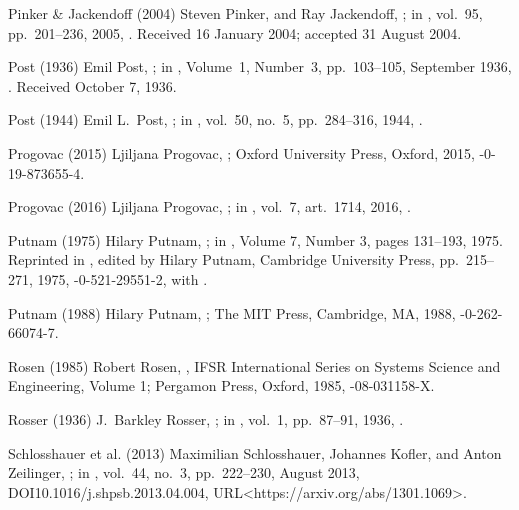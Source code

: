 \biblabel Pinker \& Jackendoff (2004)
Steven Pinker, and Ray Jackendoff,
;
in ,
vol.\ 95, pp.\ 201--236, 2005,
.
Received 16 January 2004; accepted 31 August 2004.

\biblabel Post (1936)
Emil Post,
;
in ,
Volume\ 1, Number\ 3, pp.~103--105, September 1936,
.
Received October 7, 1936.

\biblabel Post (1944)
Emil L.\ Post,
;
in ,
vol.\ 50, no.~5, pp.\ 284--316, 1944,
.

\biblabel Progovac (2015)
Ljiljana Progovac,
;
Oxford University Press, Oxford, 2015,
-0-19-873655-4.

\biblabel Progovac (2016)
Ljiljana Progovac,
;
in ,
vol.\ 7, art.\ 1714, 2016,
.

\biblabel Putnam (1975)
Hilary Putnam,
;
in ,
Volume 7, Number 3, pages 131--193, 1975.
Reprinted in
,
edited by Hilary Putnam,
Cambridge University Press, pp.\ 215--271, 1975,
-0-521-29551-2, with
.

\biblabel Putnam (1988)
Hilary Putnam,
;
The MIT Press, Cambridge, MA, 1988,
-0-262-66074-7.

\biblabel Rosen (1985)
Robert Rosen,
,
 IFSR International Series on
 Systems Science and Engineering, Volume 1;
 Pergamon Press, Oxford, 1985,
-08-031158-X.

\biblabel Rosser (1936)
J.\ Barkley Rosser,
;
in ,
vol.\ 1, pp.\ 87--91, 1936,
.

\biblabel Schlosshauer et al. (2013)
Maximilian Schlosshauer, Johannes Kofler, and Anton Zeilinger,
;
in ,
vol.\ 44, no.\ 3, pp.\ 222--230, August 2013,
DOI{10.1016/j.shpsb.2013.04.004},
URL<https://arxiv.org/abs/1301.1069>.

